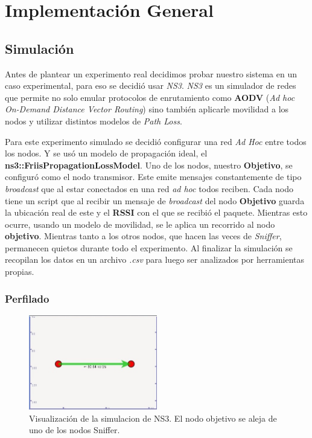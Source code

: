 \chapter{Implementación General}


\section{Simulación}

Antes de plantear un experimento real decidimos probar nuestro sistema en un caso experimental, para eso se decidió usar \textit{NS3}. \textit{NS3} es un simulador de redes que permite no solo emular protocolos de enrutamiento como \textbf{AODV} (\textit{Ad hoc On-Demand Distance Vector Routing}) sino también aplicarle movilidad a los nodos y utilizar distintos modelos de \textit{Path Loss}.

Para este experimento simulado se decidió configurar una red \textit{Ad Hoc} entre todos los nodos. Y se usó un modelo de propagación ideal, el \textbf{ns3::FriisPropagationLossModel}.
Uno de los nodos, nuestro \textbf{Objetivo}, se configuró como el nodo transmisor. Este emite mensajes constantemente de tipo \textit{broadcast} que al estar conectados en una red \textit{ad hoc} todos reciben.
Cada nodo tiene un script que al recibir un mensaje de \textit{broadcast} del nodo \textbf{Objetivo} guarda la ubicación real de este y el \textbf{RSSI} con el que se recibió el paquete.
Mientras esto ocurre, usando un modelo de movilidad, se le aplica un recorrido al nodo \textbf{objetivo}. Mientras tanto a los otros nodos, que hacen las veces de \textit{Sniffer}, permanecen quietos durante todo el experimento. Al finalizar la simulación se recopilan los datos en un archivo \textit{.csv} para luego ser analizados por herramientas propias.

\subsection{Perfilado}

\begin{figure}[!htb]
	\centering
\includegraphics[width=0.5\textwidth]{Figuras/profiling/simulation/profiling_pyvis_going_away2.jpg}
	\captionsetup{margin=2cm}
	\caption[Visualización de la simulacion de NS3. El nodo objetivo se aleja del nodo Sniffer.]{Visualización de la simulacion de NS3. El nodo objetivo se aleja de uno de los nodos Sniffer.}
	\label{fig:infra-diagram}
\end{figure}
 
